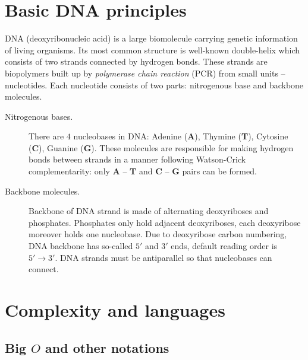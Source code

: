 \section{Basic DNA principles}
	
	DNA (deoxyribonucleic acid) is a large biomolecule carrying genetic information of living organisms. Its most common structure is well-known double-helix which consists of two strands connected by hydrogen bonds. These strands are biopolymers built up by {\em polymerase chain reaction} (PCR) from small units -- nucleotides. Each nucleotide consists of two parts: nitrogenous base and backbone molecules.
	\begin{description}
		\item[Nitrogenous bases.] There are $4$ nucleobases in DNA: Adenine ({\bf A}), Thymine ({\bf T}), Cytosine ({\bf C}), Guanine ({\bf G}). These molecules are responsible for making hydrogen bonds between strands in a manner following Watson-Crick complementarity: only {\bf A} -- {\bf T} and {\bf C} -- {\bf G} pairs can be formed.
		\item[Backbone molecules.] Backbone of DNA strand is made of alternating deoxyriboses and phosphates. Phosphates only hold adjacent deoxyriboses, each deoxyribose moreover holds one nucleobase. Due to deoxyribose carbon numbering, DNA backbone has so-called $5'$ and $3'$ ends, default reading order is $5'\rightarrow 3'$. DNA strands must be antiparallel so that nucleobases can connect.
	\end{description}

\section{Complexity and languages}
	
	\subsection{Big $O$ and other notations}
		
